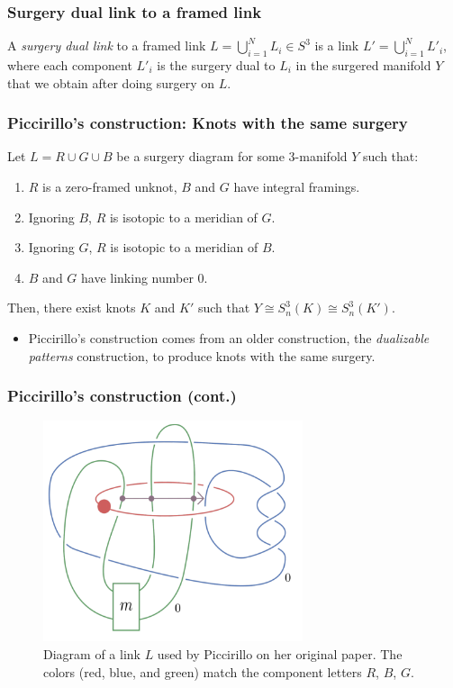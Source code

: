 \documentclass{beamer}
\theoremstyle{ex}
\theoremstyle{rem}
\begin{document}
	\begin{frame}
	\frametitle{Surgery dual link to a framed link}
		\begin{definition}
		A \textit{surgery dual link} to a framed link $L=\bigcup^{N}_{i=1} L_i \in S^3$ is a link $L' = \bigcup^{N}_{i=1} L'_i$, where each component $L'_i$ is the surgery dual to $L_i$ in the surgered manifold $Y$ that we obtain after doing surgery on $L$.
		\end{definition}
	\end{frame}
	


	\begin{frame}
	\frametitle{Piccirillo's construction: Knots with the same surgery}
	\begin{theorem}[Piccirillo 2018]
		Let $L = R \cup G \cup B$ be a surgery diagram for some 3-manifold $Y$ such that:
		\begin{enumerate}
			\item $R$ is a zero-framed unknot, $B$ and $G$ have integral framings.
			\item Ignoring $B$, $R$ is isotopic to a meridian of $G$.
			\item Ignoring $G$, $R$ is isotopic to a meridian of $B$.
			\item $B$ and $G$ have linking number $0$.
		\end{enumerate}
		Then, there exist knots $K$ and $K'$ such that $Y \cong S^3_{n}(K) \cong S^3_{n}(K')$.
	\end{theorem}
	\begin{itemize}
		\item Piccirillo's construction comes from an older construction, the \textit{dualizable patterns} construction, to produce knots with the same surgery.
	\end{itemize}
\end{frame}

\begin{frame}
	\frametitle{Piccirillo's construction (cont.)}
	\begin{figure}
		\begin{center}
			\includegraphics[width=3in]{picci.png}
			\caption{Diagram of a link $L$ used by Piccirillo on her original paper. The colors (red, blue, and green) match the component letters $R$, $B$, $G$.}
		\end{center}
	\end{figure}
\end{frame}
\end{document}
